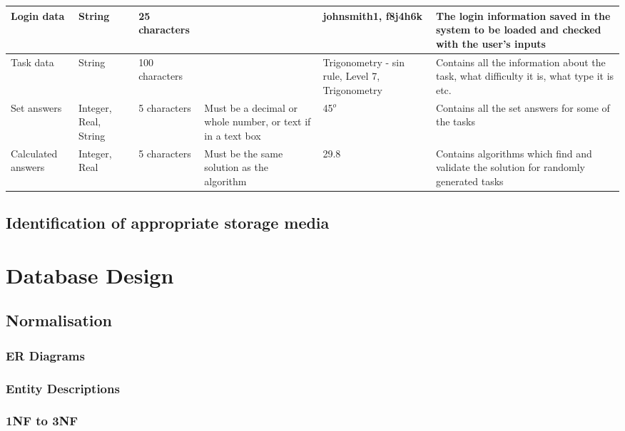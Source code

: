 \begin{center}
\begin{tabular}{|p{3.4cm}|p{1.2cm}|p{2cm}|p{2cm}|p{2cm}|p{3.5cm}|}
\hline
Login data & String & 25 characters & & johnsmith1, f8j4h6k & The login information saved in the system to be loaded and checked with the user's inputs \\ \hline
Task data & String & 100 characters & & Trigonometry - sin rule, Level 7, Trigonometry & Contains all the information about the task, what difficulty it is, what type it is etc. \\ \hline
Set answers & Integer, Real, String & 5 characters & Must be a decimal or whole number, or text if in a text box & 45{$^o$} & Contains all the set answers for some of the tasks \\ \hline
Calculated answers & Integer, Real & 5 characters & Must be the same solution as the algorithm & 29.8 & Contains algorithms which find and validate the solution for randomly generated tasks \\ \hline
\end{tabular}
\end{center}


\subsection{Identification of appropriate storage media}

\section{Database Design}

\subsection{Normalisation}

\subsubsection{ER Diagrams}

\subsubsection{Entity Descriptions}

\subsubsection{1NF to 3NF}

